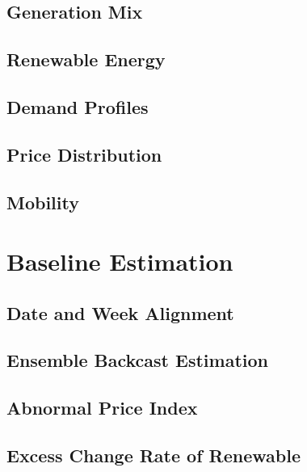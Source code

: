 \documentclass[11pt]{article}
\numberwithin{equation}{section}
\numberwithin{table}{section}
\numberwithin{figure}{section}
\begin{document}
\subsection{Generation Mix}

\subsection{Renewable Energy}

\subsection{Demand Profiles}

\subsection{Price Distribution}

\subsection{Mobility}






\newpage
\section{Baseline Estimation} \label{sec:baseline}

\subsection{Date and Week Alignment}

\subsection{Ensemble Backcast Estimation}

\subsection{Abnormal Price Index}

\subsection{Excess Change Rate of Renewable}





\newpage
\end{document}
